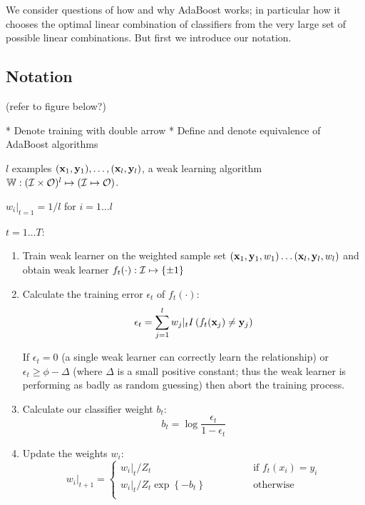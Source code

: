 We consider questions of how and why AdaBoost works; in
particular how it chooses the optimal linear combination of
classifiers from the very large set of possible linear combinations.
But first we introduce our notation.

\subsection{Notation}

(refer to figure below?)

* Denote training with double arrow
* Define and denote equivalence of AdaBoost algorithms

\begin{linefigure}
\label{fig:boosting algorithm}
 $l$ examples $(\mathbf{x}_1, \mathbf{y}_1), \ldots, (\mathbf{x}_l,
\mathbf{y}_l)$, a weak learning algorithm $\mathbb{W} : (\mathcal{I} \times \mathcal{O})^l
\mapsto (\mathcal{I} \mapsto \mathcal{O})$.
\par
{} $w_i|_{t=1} = 1/l$ for $i=1 \ldots l$
\par
{} $t=1 \ldots T$:


\begin{enumerate}

\item	Train weak learner on the weighted sample set 
	$(\mathbf{x}_1, \mathbf{y}_1, w_1) \ldots (\mathbf{x}_l, \mathbf{y}_l, w_l)$
	and obtain weak learner $f_t(\cdot) : \mathcal{I} \mapsto \{\pm 1\}$

\item	Calculate the training error $\epsilon_t$ of $f_t(\cdot)$:
	\begin{equation}
	\epsilon_t = \sum_{j=1}^l w_j |_t 
	I \left( f_t(\mathbf{x}_j) \neq \mathbf{y}_j\right)
	\end{equation}

	If $\epsilon_t = 0$ (a single weak learner can correctly learn
	the relationship) or $\epsilon_t \geq \phi - \Delta$ (where
	$\Delta$ is a small positive constant; thus the weak
	learner is performing as badly as random guessing) then abort
	the training process.

\item	Calculate our classifier weight $b_t$:
	\begin{equation}
	b_t = \log \frac{\epsilon_t}{1 - \epsilon_t}
	\end{equation}

\item	Update the weights $w_i$:
	\begin{equation}
	w_i|_{t+1} = \left\{
	\begin{array}{cl}
		w_i|_t / Z_t	&	\qquad \qquad \mbox{if
		$f_t(x_i) = y_i$} \\
		w_i|_t / Z_t \exp \left\{ -b_t \right\} & \qquad \qquad
		\mbox{otherwise} \\
	\end{array} \right.
	\end{equation}


\end{enumerate}
\end{linefigure}
